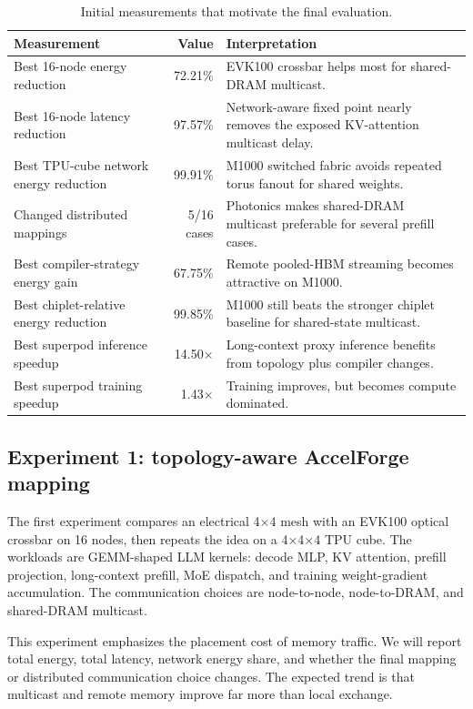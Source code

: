 \documentclass[conference,onecolumn]{IEEEtran}
\begin{document}
\begin{table}[H]
\centering
\caption{Initial measurements that motivate the final evaluation.}
\label{tab:pilot}
\footnotesize
\begin{tabularx}{\linewidth}{l r Y}
\toprule
Measurement & Value & Interpretation \\
\midrule
Best 16-node energy reduction & 72.21\% & EVK100 crossbar helps most for shared-DRAM multicast. \\
Best 16-node latency reduction & 97.57\% & Network-aware fixed point nearly removes the exposed KV-attention multicast delay. \\
Best TPU-cube network energy reduction & 99.91\% & M1000 switched fabric avoids repeated torus fanout for shared weights. \\
Changed distributed mappings & 5/16 cases & Photonics makes shared-DRAM multicast preferable for several prefill cases. \\
Best compiler-strategy energy gain & 67.75\% & Remote pooled-HBM streaming becomes attractive on M1000. \\
Best chiplet-relative energy reduction & 99.85\% & M1000 still beats the stronger chiplet baseline for shared-state multicast. \\
Best superpod inference speedup & 14.50\(\times\) & Long-context proxy inference benefits from topology plus compiler changes. \\
Best superpod training speedup & 1.43\(\times\) & Training improves, but becomes compute dominated. \\
\bottomrule
\end{tabularx}
\end{table}

\subsection{Experiment 1: topology-aware AccelForge mapping}

The first experiment compares an electrical 4\(\times\)4 mesh with an EVK100
optical crossbar on 16 nodes, then repeats the idea on a 4\(\times\)4\(\times\)4
TPU cube. The workloads are GEMM-shaped LLM kernels: decode MLP, KV attention,
prefill projection, long-context prefill, MoE dispatch, and training
weight-gradient accumulation. The communication choices are node-to-node,
node-to-DRAM, and shared-DRAM multicast.

This experiment emphasizes the placement cost of memory traffic. We will report total energy, total latency,
network energy share, and whether the final mapping or distributed
communication choice changes. The expected trend is that multicast and remote
memory improve far more than local exchange.
\end{document}
